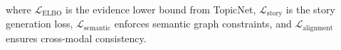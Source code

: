 \documentclass{article}
\begin{document}
where $\mathcal{L}_{\text{ELBO}}$ is the evidence lower bound from TopicNet, $\mathcal{L}_{\text{story}}$ is the story generation loss, $\mathcal{L}_{\text{semantic}}$ enforces semantic graph constraints, and $\mathcal{L}_{\text{alignment}}$ ensures cross-modal consistency. 
\end{document}
